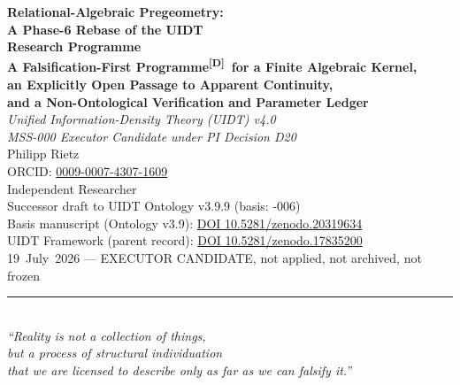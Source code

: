 \documentclass[12pt,a4paper,twoside]{article}
\theoremstyle{plain}
\theoremstyle{definition}
\theoremstyle{remark}
\newcommand{\catmark}[1]{\textsuperscript{\textsf{\textbf{[#1]}}}}
\begin{document}
\pagestyle{uidtontology}

\begin{titlepage}
\vspace*{1.6cm}
\begin{center}
{\LARGE\bfseries Relational-Algebraic Pregeometry:\\[0.25em]
A Phase-6 Rebase of the UIDT\\[0.25em]
Research Programme}\\[0.9em]
{\small\bfseries A Falsification-First Programme\catmark{D}\ for a Finite Algebraic Kernel,\\[0.25em]
an Explicitly Open Passage to Apparent Continuity,\\[0.25em]
and a Non-Ontological Verification and Parameter Ledger}\\[1.5em]
{\large\itshape Unified Information-Density Theory (UIDT) v4.0\\[0.25em]
MSS-000 Executor Candidate under PI Decision D20}\\[2.6em]
{\small Philipp Rietz}\\[0.5em]
{\small ORCID: \href{https://orcid.org/0009-0007-4307-1609}{0009-0007-4307-1609}}\\[0.2em]
{\small Independent Researcher}\\[3em]
{\normalsize Successor draft to UIDT Ontology v3.9.9 (basis: -006)}\\[0.5em]
{\small Basis manuscript (Ontology v3.9):
\href{https://doi.org/10.5281/zenodo.20319634}{DOI 10.5281/zenodo.20319634}}\\[0.25em]
{\small UIDT Framework (parent record):
\href{https://doi.org/10.5281/zenodo.17835200}{DOI 10.5281/zenodo.17835200}}\\[0.5em]
{\small 19~July~2026 --- EXECUTOR CANDIDATE, not applied, not archived, not frozen}\\[2.2em]
\rule{0.6\textwidth}{0.4pt}\\[1em]
{\small\itshape ``Reality is not a collection of things,\\
but a process of structural individuation\\
that we are licensed to describe only as far as we can falsify it.''}\\[1.4em]
\end{center}
\end{titlepage}
\end{document}
